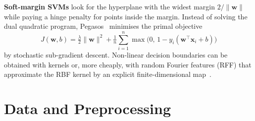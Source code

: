 \documentclass[10pt,twocolumn,a4paper]{article}
\begin{document}
\textbf{Soft-margin SVMs} look for the hyperplane with the widest margin
$2/\lVert\mathbf w\rVert$ while paying a hinge penalty for points inside
the margin. Instead of solving the dual quadratic program,
Pegasos~\cite{pegasos} minimises the primal objective
\begin{equation}
  J(\mathbf{w},b)=\tfrac{\lambda}{2}\lVert\mathbf{w}\rVert^{2}
  +\tfrac{1}{n}\sum_{i=1}^{n}\max\!\big(0,\,1-y_i(\mathbf{w}^{\top}\mathbf{x}_i+b)\big)
  \label{eq:primal}
\end{equation}
by stochastic sub-gradient descent. Non-linear decision boundaries can be
obtained with kernels or, more cheaply, with random Fourier
features (RFF) that approximate the RBF kernel by an explicit
finite-dimensional map~\cite{rff}.

\section{Data and Preprocessing}
\end{document}
